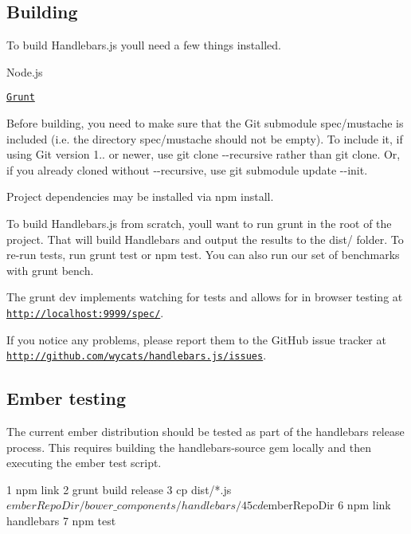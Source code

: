 \subsection*{Building}

To build Handlebars.\+js you\textquotesingle{}ll need a few things installed.


\begin{DoxyItemize}
\item Node.\+js
\item \href{http://gruntjs.com/getting-started}{\tt Grunt}
\end{DoxyItemize}

Before building, you need to make sure that the Git submodule {\ttfamily spec/mustache} is included (i.\+e. the directory {\ttfamily spec/mustache} should not be empty). To include it, if using Git version 1.. or newer, use {\ttfamily git clone -\/-\/recursive} rather than {\ttfamily git clone}. Or, if you already cloned without {\ttfamily -\/-\/recursive}, use {\ttfamily git submodule update -\/-\/init}.

Project dependencies may be installed via {\ttfamily npm install}.

To build Handlebars.\+js from scratch, you\textquotesingle{}ll want to run {\ttfamily grunt} in the root of the project. That will build Handlebars and output the results to the dist/ folder. To re-\/run tests, run {\ttfamily grunt test} or {\ttfamily npm test}. You can also run our set of benchmarks with {\ttfamily grunt bench}.

The {\ttfamily grunt dev} implements watching for tests and allows for in browser testing at {\ttfamily \href{http://localhost:9999/spec/}{\tt http\+://localhost\+:9999/spec/}}.

If you notice any problems, please report them to the Git\+Hub issue tracker at \href{http://github.com/wycats/handlebars.js/issues}{\tt http\+://github.\+com/wycats/handlebars.\+js/issues}.

\subsection*{Ember testing}

The current ember distribution should be tested as part of the handlebars release process. This requires building the {\ttfamily handlebars-\/source} gem locally and then executing the ember test script.


\begin{DoxyCode}
1 npm link
2 grunt build release
3 cp dist/*.js $emberRepoDir/bower\_components/handlebars/
4 
5 cd $emberRepoDir
6 npm link handlebars
7 npm test
\end{DoxyCode}



